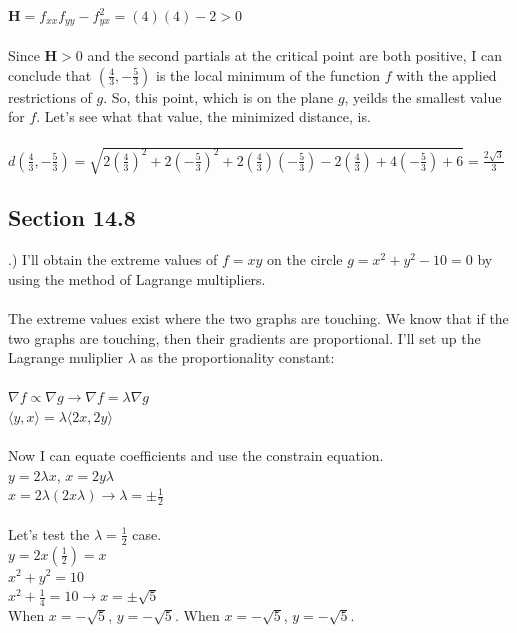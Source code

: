 \documentclass[12pt]{article}
\begin{document}
\noindent $\mathbf{H} = f_{xx}f_{yy} - f_{yx}^{2} = (4)(4) - 2 > 0$\\\\
\noindent Since $\mathbf{H} > 0$ and the second partials at the critical point are both positive, I can conclude that $(\frac{4}{3}, -\frac{5}{3})$
is the local minimum of the function $f$ with the applied restrictions of $g$. So, this point, which is on the plane $g$, yeilds the smallest value for $f$.
Let's see what that value, the minimized distance, is.\\\\
\noindent  $ d(\frac{4}{3}, -\frac{5}{3}) 
=\sqrt{2(\frac{4}{3})^{2}+2(-\frac{5}{3})^{2}+2(\frac{4}{3})(-\frac{5}{3})-2(\frac{4}{3})+4(-\frac{5}{3})+6} = \frac{2\sqrt{3}}{3}$\clearpage


\subsection*{Section 14.8}
.) I'll obtain the extreme values of $f = xy$ on the circle $g = x^{2} + y^{2} -10 = 0$ by using the method of Lagrange multipliers.\\\\
\noindent The extreme values exist where the two graphs are touching. We know that if the two graphs are touching, then their gradients are proportional. 
I'll set up the Lagrange muliplier $\lambda$ as the proportionality constant: \\\\
\noindent $\nabla f \propto \nabla g \rightarrow \nabla f = \lambda \nabla g$\\
\noindent $ \langle y, x\rangle = \lambda \langle 2x, 2y\rangle$\\\\
\noindent Now I can equate coefficients and use the constrain equation.\\
\noindent $y = 2\lambda x$, \hspace{10pt} $x = 2y\lambda$\\
\noindent $x = 2\lambda (2x\lambda) \rightarrow \lambda = \pm \frac{1}{2}$\\\\
\noindent Let's test the $\lambda = \frac{1}{2}$ case.\\
\noindent $y = 2x(\frac{1}{2}) = x$\\
\noindent $x^{2} + y^{2} = 10$\\
\noindent $x^{2} + \frac{1}{4} = 10 \rightarrow x = \pm\sqrt{5}$\\
\noindent When $x = -\sqrt{5}$, $y = -\sqrt{5}$. When $x = -\sqrt{5}$, $y = -\sqrt{5}$.\\\\
\end{document}
